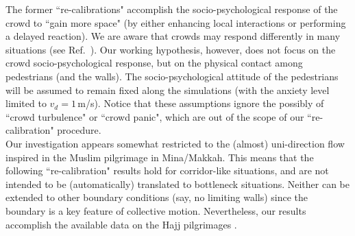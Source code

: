 {The former ``re-calibrations" accomplish the socio-psychological
response of the crowd to ``gain more space" (by either enhancing local
interactions or performing a delayed reaction). We are aware that
crowds may respond differently in many situations (see Ref.~\cite{drury1}). Our working
hypothesis, however, does not focus on the crowd socio-psychological
response, but on the physical contact among pedestrians (and the
walls). The socio-psychological attitude of the pedestrians will be
assumed to remain fixed along the simulations (with the anxiety level
limited to $v_d=1\,$m/s). Notice that these assumptions ignore the
possibly of ``crowd turbulence" or ``crowd panic", which are out of the
scope of our ``re-calibration" procedure.\\


Our investigation appears somewhat restricted to the (almost)
uni-direction flow inspired in the Muslim pilgrimage in Mina/Makkah.
This means that the following ``re-calibration" results hold for
corridor-like situations, and are not intended to be (automatically)
translated to bottleneck situations. Neither can be extended to other
boundary conditions (say, no limiting walls) since the boundary is a
key feature of collective motion. Nevertheless, our results accomplish
the available data on the Hajj pilgrimages \cite{helbing3,lohner1}.

}

